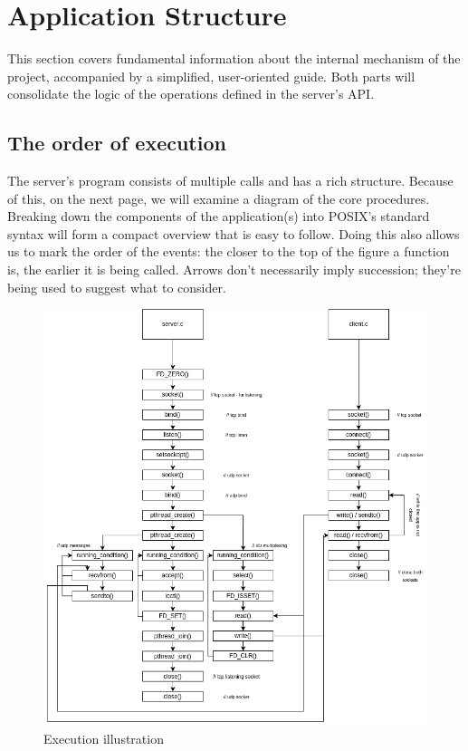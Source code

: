 \documentclass[runningheads]{llncs}
\begin{document}

\section{Application Structure}

This section covers fundamental information about the internal mechanism of the project, accompanied by a simplified, user-oriented guide. Both parts will consolidate the logic of the operations defined in the server's API.

\subsection{The order of execution}

The server's program consists of multiple calls and has a rich structure. Because of this, on the next page, we will examine a diagram of the core procedures. Breaking down the components of the application(s) into POSIX's standard syntax will form a compact overview that is easy to follow. Doing this also allows us to mark the order of the events: the closer to the top of the figure a function is, the earlier it is being called. Arrows don't necessarily imply succession; they're being used to suggest what to consider.

\newpage
\begin{figure}[!h]
    \includegraphics[width=\textwidth]{RR execution diagram.drawio.png}
    \caption{Execution illustration} \label{fig1}
\end{figure}
\end{document}

